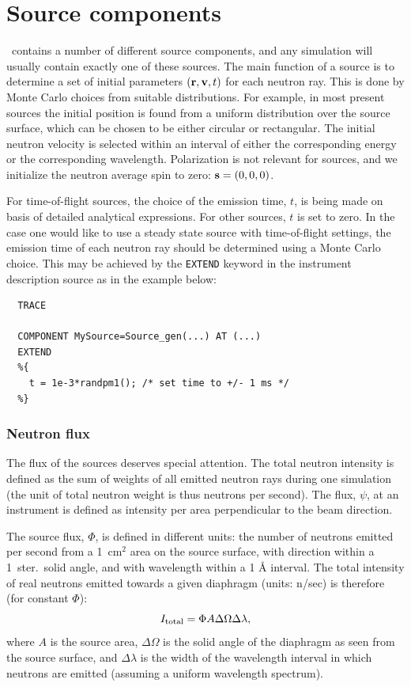 
\chapter{Source components}
\label{c:source}

\MCS\ contains a number of different source components,
and any simulation will usually contain exactly one of these sources.
The main function of a source is to determine a set of initial
parameters $({\bf r}, {\bf v}, t)$
for each neutron ray. This is done by Monte Carlo choices from
suitable distributions. For example, in most present sources
the initial position is
found from a uniform distribution over the source surface,
which can be chosen to be either circular or rectangular.
The initial neutron velocity is selected within an interval
of either the corresponding energy or the corresponding wavelength.
Polarization is not relevant for sources,
and we initialize the neutron average spin to zero: ${\bf s}=(0,0,0)$.

For time-of-flight sources, the choice of the emission time, $t$,
is being made on basis of detailed analytical expressions.
For other sources, $t$ is set to zero.
In the case one would like to use a steady state source
with time-of-flight settings,
the emission time of each neutron ray should be determined using
a Monte Carlo choice. This may be achieved by
the \verb+EXTEND+ keyword in the instrument description source
as in the example below:

\begin{verbatim}
  TRACE

  COMPONENT MySource=Source_gen(...) AT (...)
  EXTEND
  %{
    t = 1e-3*randpm1(); /* set time to +/- 1 ms */
  %}
\end{verbatim}

\subsection{Neutron flux}
\label{s:neutron-flux}
The flux of the sources deserves special attention. The total neutron
intensity is defined as the sum of weights of all emitted neutron rays
during one simulation
(the unit of total neutron weight is thus neutrons per second).
The flux, $\psi$, at an instrument is defined as intensity per area perpendicular
to the beam direction.

The source flux, $\Phi$, is defined in different units:
the number of neutrons emitted per second from a
1~cm$^2$ area on the source surface,
with direction within a 1~ster.\ solid angle,
and with wavelength within a 1 {\AA} interval.
The total intensity of real neutrons emitted towards a given diaphragm
(units: n/sec) is therefore (for constant $\Phi$):
\begin{equation}
I_{\rm total} = \Phi A \Delta\Omega \Delta\lambda ,
\end{equation}
where $A$ is the source area, $\Delta\Omega$ is the solid angle of the
diaphragm as seen from the source surface, and $\Delta\lambda$ is the
width of the wavelength interval in which neutrons are emitted (assuming
a uniform wavelength spectrum).

